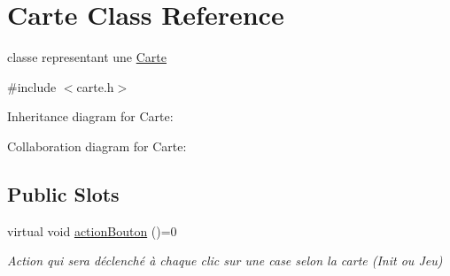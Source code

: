 \hypertarget{class_carte}{}\section{Carte Class Reference}
\label{class_carte}


classe representant une \hyperlink{class_carte}{Carte}  




{\ttfamily \#include $<$carte.\+h$>$}



Inheritance diagram for Carte\+:


Collaboration diagram for Carte\+:
\subsection*{Public Slots}
\begin{DoxyCompactItemize}
\item 
virtual void \hyperlink{class_carte_a8628e3d1c1c812b945f2cc3987ae1a40}{action\+Bouton} ()=0
\begin{DoxyCompactList}\small\item\em Action qui sera déclenché à chaque clic sur une case selon la carte (Init ou Jeu) \end{DoxyCompactList}\end{DoxyCompactItemize}
